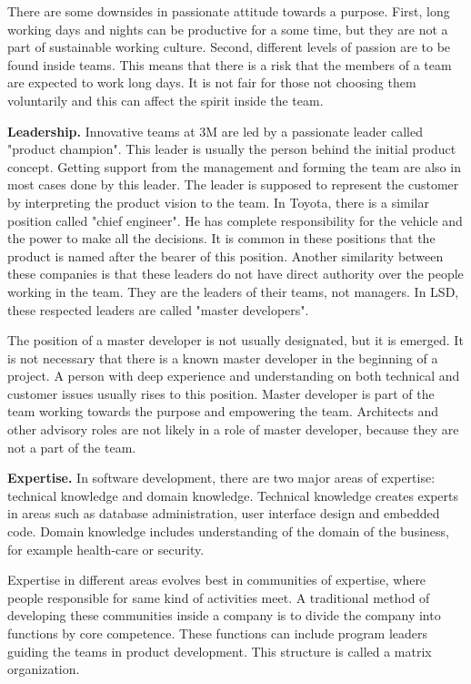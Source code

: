 There are some downsides in passionate attitude towards a purpose. First, long working days and nights can be productive for a some time, but they are not a part of sustainable working culture. Second, different levels of passion are to be found inside teams. This means that there is a risk that the members of a team are expected to work long days. It is not fair for those not choosing them voluntarily and this can affect the spirit inside the team.

\textbf{Leadership.} Innovative teams at 3M are led by a passionate leader called "product champion". This leader is usually the person behind the initial product concept. Getting support from the management and forming the team are also in most cases done by this leader. The leader is supposed to represent the customer by interpreting the product vision to the team. In Toyota, there is a similar position called "chief engineer". He has complete responsibility for the vehicle and the power to make all the decisions. It is common in these positions that the product is named after the bearer of this position. Another similarity between these companies is that these leaders do not have direct authority over the people working in the team. They are the leaders of their teams, not managers. In LSD, these respected leaders are called "master developers".

The position of a master developer is not usually designated, but it is emerged. It is not necessary that there is a known master developer in the beginning of a project. A person with deep experience and understanding on both technical and customer issues usually rises to this position. Master developer is part of the team working towards the purpose and empowering the team. Architects and other advisory roles are not likely in a role of master developer, because they are not a part of the team.

\textbf{Expertise.} In software development, there are two major areas of expertise: technical knowledge and domain knowledge. Technical knowledge creates experts in areas such as database administration, user interface design and embedded code. Domain knowledge includes understanding of the domain of the business, for example health-care or security.

Expertise in different areas evolves best in communities of expertise, where people responsible for same kind of activities meet. A traditional method of developing these communities inside a company is to divide the company into functions by core competence. These functions can include program leaders guiding the teams in product development. This structure is called a matrix organization.

